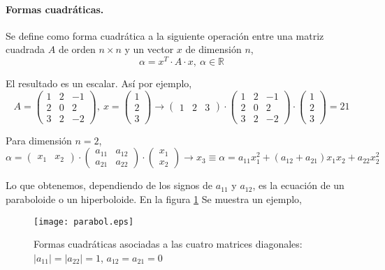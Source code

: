 \paragraph{Formas cuadráticas.} Se define como forma cuadrática a la siguiente operación entre una matriz cuadrada $A$ de orden $n \times n$ y un vector $x$ de dimensión $n$,
\begin{equation*}
\alpha=x^T\cdot A \cdot x, \ \alpha \in \mathbb{R}
\end{equation*}

El resultado es un escalar. Así por ejemplo,
\begin{equation*}
A=\begin{pmatrix}
1& 2& -1\\
2& 0& 2\\
3& 2& -2
\end{pmatrix}, \ x=\begin{pmatrix}
1\\
2\\
3
\end{pmatrix} \rightarrow \begin{pmatrix}
1& 2& 3
\end{pmatrix} \cdot \begin{pmatrix}
1& 2& -1\\
2& 0& 2\\
3& 2& -2
\end{pmatrix} \cdot \begin{pmatrix}
1\\
2\\
3
\end{pmatrix}= 21
\end{equation*}

Para dimensión $n=2$, 
\begin{equation*}
\alpha =\begin{pmatrix}
x_1& x_2
\end{pmatrix}\cdot \begin{pmatrix}
a_{11}& a_{12}\\
a_{21}& a_{22}
\end{pmatrix}\cdot \begin{pmatrix}
x_1\\
x_2
\end{pmatrix} \rightarrow x_3\equiv \alpha=a_{11}x_1^2+(a_{12}+a_{21})x_1x_2+a_{22}x_2^2
\end{equation*}

Lo que obtenemos, dependiendo de los signos de $a_{11}$ y $a_{12}$, es la ecuación de un paraboloide o un hiperboloide. En la figura \ref{fig:parabol} Se muestra un ejemplo,
\begin{figure}[h]
\centering
\texttt{[image: parabol.eps]}
\caption{Formas cuadráticas asociadas a las cuatro matrices diagonales: $\vert a_{11}\vert=\vert a_{22}\vert=1$, $a_{12}=a_{21}=0$}
\label{fig:parabol}
\end{figure}

